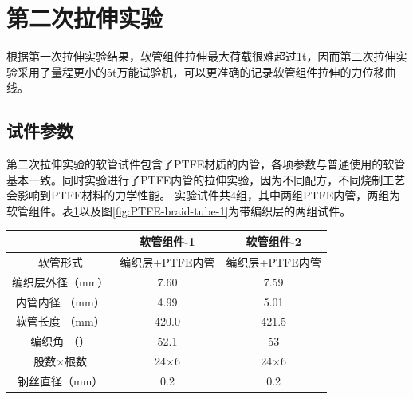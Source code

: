 \begin{figure}[!htb]
	\label{fig:experiment-1-fail}
\end{figure}









\section{第二次拉伸实验}

根据第一次拉伸实验结果，软管组件拉伸最大荷载很难超过1t，因而第二次拉伸实验采用了量程更小的5t万能试验机，可以更准确的记录软管组件拉伸的力位移曲线。

\subsection{试件参数}
第二次拉伸实验的软管试件包含了PTFE材质的内管，各项参数与普通使用的软管基本一致。同时实验进行了PTFE内管的拉伸实验，因为不同配方，不同烧制工艺会影响到PTFE材料的力学性能。
 实验试件共4组，其中两组PTFE内管，两组为软管组件。表\ref{tab:hose-specimen-II}以及图\ref{fig:PTFE-braid-tube-1}为带编织层的两组试件。
\begin{table}[!htb]
	\centering
	\label{tab:hose-specimen-II}
	\begin{tabular*}{0.8\textwidth}{@{\extracolsep{\fill}}>{\hspace{0.5cm}}ccc}
		\toprule
		&     软管组件-1     &     软管组件-2     \\ \midrule
		软管形式& 编织层+PTFE内管&编织层+PTFE内管\\
		编织层外径（mm）            &     7.60      &     7.59      \\
		内管内径 （mm）           &     4.99      &     5.01      \\
		软管长度 （mm）           &     420.0     &     421.5     \\
		编织角 （\textdegree） &     52.1      &     53      \\
		股数$ \times $根数    & 24$ \times $6 & 24$ \times $6 \\
		钢丝直径（mm）          &      0.2      &      0.2      \\ \bottomrule
	\end{tabular*} 
\end{table}


